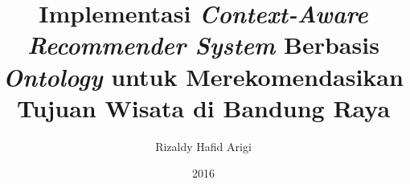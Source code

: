 \documentclass[a4paper,12pt,oneside]{book}
\title{Implementasi \textit{Context-Aware Recommender System} Berbasis \textit{Ontology} untuk Merekomendasikan Tujuan Wisata di Bandung Raya}\let\Title\@title   %
\author{Rizaldy Hafid Arigi}  \let\Author\@author  %
\date{2016}           \let\Date\@date %
\newif\iflogTA
\begin{document}
\begin{titlepage}
\thispagestyle{empty}

\pagebreak
\thispagestyle{empty}

\pagebreak
\end{titlepage}

\iflogTA
\pagebreak
\addcontentsline{toc}{chapter}{Abstract}

\pagebreak
\addcontentsline{toc}{chapter}{Lembar Persembahan}

\pagebreak
\addcontentsline{toc}{chapter}{Kata Pengantar}

\pagebreak
\fi
\cleardoublepage
{}
\tableofcontents
\iflogTA
\newpage
\cleardoublepage
\addcontentsline{toc}{chapter}{Daftar Gambar}
\listoffigures
\newpage
\cleardoublepage
\addcontentsline{toc}{chapter}{Daftar Tabel}
\listoftables
\fi
%
\cleardoublepage
{}

%

%

%
%
%
%
%
\cleardoublepage
{}

%
\cleardoublepage
{}

\end{document}
